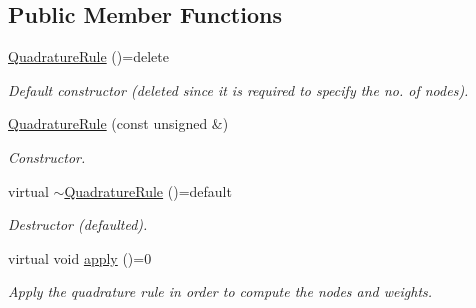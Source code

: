 \subsection*{Public Member Functions}
\begin{DoxyCompactItemize}
\item 
\hypertarget{classQuadratureRule_ac7fb9aaf8e3f9eae03235f68a935880a}{\hyperlink{classQuadratureRule_ac7fb9aaf8e3f9eae03235f68a935880a}{Quadrature\-Rule} ()=delete}\label{classQuadratureRule_ac7fb9aaf8e3f9eae03235f68a935880a}

\begin{DoxyCompactList}\small\item\em Default constructor (deleted since it is required to specify the no. of nodes). \end{DoxyCompactList}\item 
\hyperlink{classQuadratureRule_a376dee153044df24015711c9a8411bae}{Quadrature\-Rule} (const unsigned \&)
\begin{DoxyCompactList}\small\item\em Constructor. \end{DoxyCompactList}\item 
\hypertarget{classQuadratureRule_a80e11fbb08b332f2d4c56740cb63ac4e}{virtual \hyperlink{classQuadratureRule_a80e11fbb08b332f2d4c56740cb63ac4e}{$\sim$\-Quadrature\-Rule} ()=default}\label{classQuadratureRule_a80e11fbb08b332f2d4c56740cb63ac4e}

\begin{DoxyCompactList}\small\item\em Destructor (defaulted). \end{DoxyCompactList}\item 
\hypertarget{classQuadratureRule_ae8035f1283a63c55fbbfb4e786db8a98}{virtual void \hyperlink{classQuadratureRule_ae8035f1283a63c55fbbfb4e786db8a98}{apply} ()=0}\label{classQuadratureRule_ae8035f1283a63c55fbbfb4e786db8a98}

\begin{DoxyCompactList}\small\item\em Apply the quadrature rule in order to compute the nodes and weights. \end{DoxyCompactList}\end{DoxyCompactItemize}
